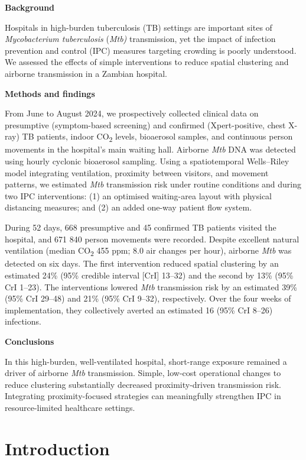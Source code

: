 \documentclass[11pt]{article}
\begin{document}
\textbf{Background}

Hospitals in high-burden tuberculosis (TB) settings are important sites of \emph{Mycobacterium tuberculosis} (\emph{Mtb)} transmission, yet the impact of infection prevention and control (IPC) measures targeting crowding is poorly understood. We assessed the effects of simple interventions to reduce spatial clustering and airborne transmission in a Zambian hospital.

\textbf{Methods and findings}

From June to August 2024, we prospectively collected clinical data on presumptive (symptom-based screening) and confirmed (Xpert-positive, chest X-ray) TB patients, indoor CO\textsubscript{2} levels, bioaerosol samples, and continuous person movements in the hospital's main waiting hall. Airborne \emph{Mtb} DNA was detected using hourly cyclonic bioaerosol sampling. Using a spatiotemporal Wells--Riley model integrating ventilation, proximity between visitors, and movement patterns, we estimated \emph{Mtb} transmission risk under routine conditions and during two IPC interventions: (1) an optimised waiting-area layout with physical distancing measures; and (2) an added one-way patient flow system.

During 52 days, 668 presumptive and 45 confirmed TB patients visited the hospital, and 671 840 person movements were recorded. Despite excellent natural ventilation (median CO\textsubscript{2} 455 ppm; 8.0 air changes per hour), airborne \emph{Mtb} was detected on six days. The first intervention reduced spatial clustering by an estimated 24\% (95\% credible interval {[}CrI{]} 13--32) and the second by 13\% (95\% CrI 1--23). The interventions lowered \emph{Mtb} transmission risk by an estimated 39\% (95\% CrI 29--48) and 21\% (95\% CrI 9--32), respectively. Over the four weeks of implementation, they collectively averted an estimated 16 (95\% CrI 8--26) infections.

\textbf{Conclusions}

In this high-burden, well-ventilated hospital, short-range exposure remained a driver of airborne \emph{Mtb} transmission. Simple, low-cost operational changes to reduce clustering substantially decreased proximity-driven transmission risk. Integrating proximity-focused strategies can meaningfully strengthen IPC in resource-limited healthcare settings.

\section{Introduction}\label{introduction}
\end{document}
